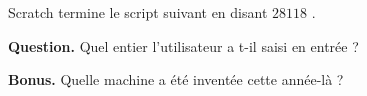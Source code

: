 \documentclass[class=report,crop=false, 12pt]{standalone}
\begin{document}


\begin{enigme}

Scratch termine le script suivant en disant \og $28118$ \fg{}.

\begin{center}
\begin{scratch}
\end{scratch} 
\end{center}


\bigskip

\textbf{Question.} Quel entier l'utilisateur a t-il saisi en entrée ?

\bigskip

\textbf{Bonus.} Quelle machine a été inventée cette année-là ?


\end{enigme}
\end{document}
